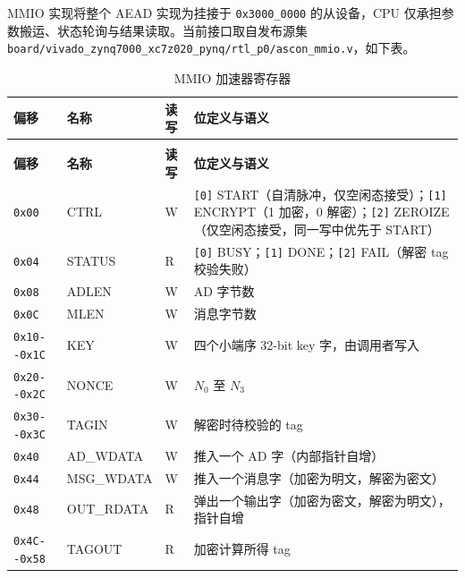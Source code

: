 MMIO 实现将整个 AEAD 实现为挂接于 \texttt{0x3000\_\allowbreak{}0000} 的从设备，CPU 仅承担参数搬运、状态轮询与结果读取。当前接口取自发布源集 \texttt{board/\allowbreak{}vivado\_\allowbreak{}zynq7000\_\allowbreak{}xc7z020\_\allowbreak{}pynq/\allowbreak{}rtl\_\allowbreak{}p0/\allowbreak{}ascon\_\allowbreak{}mmio.\allowbreak{}v}，如下表。

{\small
\renewcommand{\thetable}{2-7}
\begin{longtable}{@{}>{\raggedright\arraybackslash}p{}>{\raggedright\arraybackslash}p{}>{\raggedright\arraybackslash}p{}>{\raggedright\arraybackslash}p{}@{}}
\caption{MMIO 加速器寄存器}\label{tab:2-7}\\
\toprule
\textbf{偏移} & \textbf{名称} & \textbf{读写} & \textbf{位定义与语义} \\
\midrule
\endfirsthead
\multicolumn{4}{@{}l}{\footnotesize 续表 2-7}\\
\toprule
\textbf{偏移} & \textbf{名称} & \textbf{读写} & \textbf{位定义与语义} \\
\midrule
\endhead
\texttt{0x00} & CTRL & W & \texttt{[0]} START（自清脉冲，仅空闲态接受）；\texttt{[1]} ENCRYPT（1 加密，0 解密）；\texttt{[2]} ZEROIZE（仅空闲态接受，同一写中优先于 START） \\
\texttt{0x04} & STATUS & R & \texttt{[0]} BUSY；\texttt{[1]} DONE；\texttt{[2]} FAIL（解密 tag 校验失败） \\
\texttt{0x08} & ADLEN & W & AD 字节数 \\
\texttt{0x0C} & MLEN & W & 消息字节数 \\
\texttt{0x10-\allowbreak{}-\allowbreak{}0x1C} & KEY & W & 四个小端序 32-bit key 字，由调用者写入 \\
\texttt{0x20-\allowbreak{}-\allowbreak{}0x2C} & NONCE & W & $N_0$ 至 $N_3$ \\
\texttt{0x30-\allowbreak{}-\allowbreak{}0x3C} & TAGIN & W & 解密时待校验的 tag \\
\texttt{0x40} & AD\_\allowbreak{}WDATA & W & 推入一个 AD 字（内部指针自增） \\
\texttt{0x44} & MSG\_\allowbreak{}WDATA & W & 推入一个消息字（加密为明文，解密为密文） \\
\texttt{0x48} & OUT\_\allowbreak{}RDATA & R & 弹出一个输出字（加密为密文，解密为明文），指针自增 \\
\texttt{0x4C-\allowbreak{}-\allowbreak{}0x58} & TAGOUT & R & 加密计算所得 tag \\
\bottomrule
\end{longtable}
}

